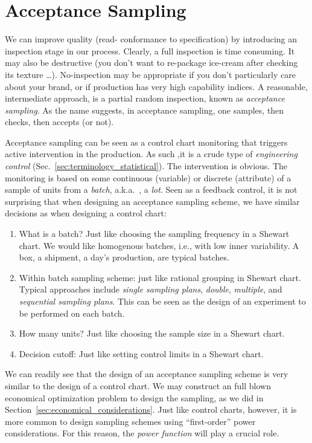 \documentclass[12pt,a4paper]{report}
\theoremstyle{plain}
\theoremstyle{definition}
\newcommand{\aka}{{a.k.a.\ }}
\begin{document}
\chapter{Acceptance Sampling}


We can improve quality (read- conformance to specification) by introducing an inspection stage in our process.
Clearly, a full inspection is time consuming. 
It may also be destructive (you don't want to re-package ice-cream after checking its texture \dots).
No-inspection may be appropriate if you don't particularly care about your brand, or if production has very high capability indices.
A reasonable, intermediate approach, is a partial random inspection, known as \emph{acceptance sampling}.
As the name suggests, in acceptance sampling, one samples, then checks, then accepts (or not).

Acceptance sampling can be seen as a control chart monitoring that triggers active intervention in the production. As such ,it is a crude type of \emph{engineering control} (Sec.~\ref{sec:terminology_statistical}).
The intervention is obvious. The monitoring is based on some continuous (variable) or discrete (attribute) of a sample of units from a \emph{batch}, \aka, a \emph{lot}.
Seen as a feedback control, it is not surprising that when designing an acceptance sampling scheme, we have similar decisions as when designing a control chart:
\begin{enumerate}
\item What is a batch? Just like choosing the sampling frequency in a Shewart chart. 
We would like homogenous batches, i.e., with low inner variability. A box, a shipment, a day's production, are typical batches. 
\item Within batch sampling scheme: just like rational grouping in Shewart chart. Typical approaches include \emph{single sampling plans}, \emph{double}, \emph{multiple}, and \emph{sequential sampling plans}.
This can be seen as the design of an experiment to be performed on each batch.
\item How many units? Just like choosing the sample size in a Shewart chart.
\item Decision cutoff: Just like setting control limits in a Shewart chart. 
\end{enumerate}
We can readily see that the design of an acceptance sampling scheme is very similar to the design of a control chart. 
We may construct an full blown economical optimization problem to design the sampling, as we did in Section~\ref{sec:economical_considerations}. Just like control charts, however, it is more common to design sampling schemes using ``first-order'' power considerations. 
For this reason, the \emph{power function} will play a crucial role.
\end{document}

